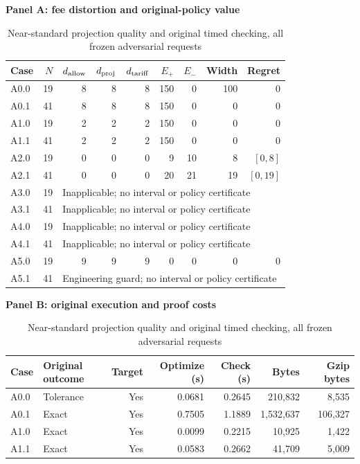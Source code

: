 \begin{table}[p]\centering
\caption{Near-standard projection quality and original timed checking, all frozen adversarial requests}\label{tab:projection64}
\begin{singlespace}\small
\textbf{Panel A: fee distortion and original-policy value}\par\smallskip
\begin{tabular}{lrrrrrrrr}\toprule
Case & $N$ & $d_{\rm allow}$ & $d_{\rm proj}$ & $d_{\rm tariff}$ & $E_+$ & $E_-$ & Width & Regret\\\midrule
A0.0 & 19 & 8 & 8 & 8 & 150 & 0 & 100 & 0 \\
A0.1 & 41 & 8 & 8 & 8 & 150 & 0 & 0 & 0 \\
A1.0 & 19 & 2 & 2 & 2 & 150 & 0 & 0 & 0 \\
A1.1 & 41 & 2 & 2 & 2 & 150 & 0 & 0 & 0 \\
A2.0 & 19 & 0 & 0 & 0 & 9 & 10 & 8 & $[0,8]$ \\
A2.1 & 41 & 0 & 0 & 0 & 20 & 21 & 19 & $[0,19]$ \\
A3.0 & 19 & \multicolumn{7}{l}{Inapplicable; no interval or policy certificate} \\
A3.1 & 41 & \multicolumn{7}{l}{Inapplicable; no interval or policy certificate} \\
A4.0 & 19 & \multicolumn{7}{l}{Inapplicable; no interval or policy certificate} \\
A4.1 & 41 & \multicolumn{7}{l}{Inapplicable; no interval or policy certificate} \\
A5.0 & 19 & 9 & 9 & 9 & 0 & 0 & 0 & 0 \\
A5.1 & 41 & \multicolumn{7}{l}{Engineering guard; no interval or policy certificate} \\
\bottomrule\end{tabular}\par\medskip
\textbf{Panel B: original execution and proof costs}\par\smallskip
\begin{tabular}{llrrrrr}\toprule
Case & Original outcome & Target & Optimize (s) & Check (s) & Bytes & Gzip bytes\\\midrule
A0.0 & Tolerance & Yes & 0.0681 & 0.2645 & 210,832 & 8,535 \\
A0.1 & Exact & Yes & 0.7505 & 1.1889 & 1,532,637 & 106,327 \\
A1.0 & Exact & Yes & 0.0099 & 0.2215 & 10,925 & 1,422 \\
A1.1 & Exact & Yes & 0.0583 & 0.2662 & 41,709 & 5,009 \\

\end{tabular}
\end{singlespace}
\end{table}
